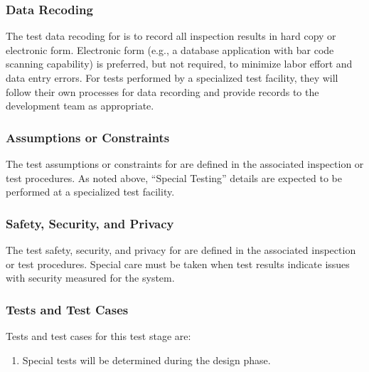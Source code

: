 \subsubsection{Data Recoding}
\label{loc:TestDataRecoding\TestIdName}

The test data recoding for \TestIdNameX is to record all inspection results in hard copy or electronic form.
Electronic form (e.g., a database application with bar code scanning capability) is preferred, but not required, to minimize labor effort and data entry errors.
For tests performed by a specialized test facility, they will follow their own processes for data recording and provide records to the development team as appropriate.

\subsubsection{Assumptions or Constraints}
\label{loc:TestAssumptionsOrConstraints\TestIdName}

The test assumptions or constraints for \TestIdNameX are defined in the associated inspection or test procedures.
As noted above, ``Special Testing'' details are expected to be performed at a specialized test facility.

\subsubsection{Safety, Security, and Privacy}
\label{loc:TestSafetySecurityPrivacy\TestIdName}

The test safety, security, and privacy for \TestIdNameX are defined in the associated inspection or test procedures.
Special care must be taken when test results indicate issues with security measured for the system.

\subsubsection{Tests and Test Cases}
\label{loc:TestsAndTestCases\TestIdName}

Tests and test cases for this test stage are:
\begin{enumerate}[itemindent=5pt,topsep=0pt,itemsep=0pt,partopsep=0pt, parsep=0pt]
	
	\item {\bf } Special tests will be determined during the design phase.

\end{enumerate}

